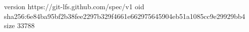 version https://git-lfs.github.com/spec/v1
oid sha256:6e84ba95bf2b38fee2297b329f4661e662975645904eb51a1085cc9e29929bb4
size 33788
